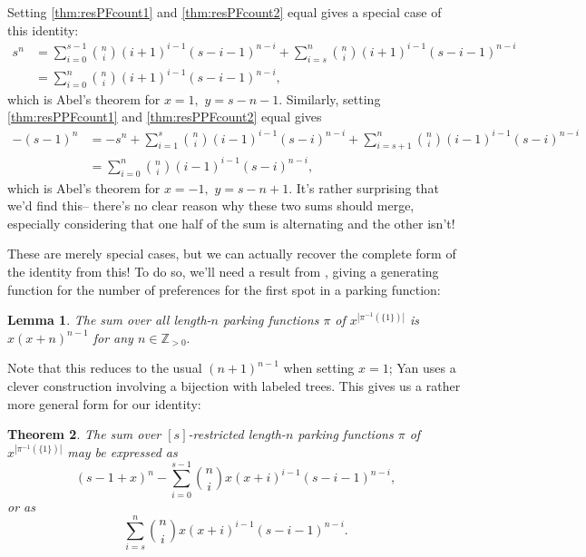 \documentclass[12 pt]{amsart}
\newtheorem{theorem}{Theorem}[section]
\newtheorem{lemma}[theorem]{Lemma}
\theoremstyle{definition} %
\theoremstyle{remark} %
\begin{document}
Setting \cref{thm:resPFcount1} and \cref{thm:resPFcount2} equal gives a special case of this identity:
\begin{align*}
    s^{n} &= \sum_{i = 0}^{s - 1} \binom{n}{i} (i + 1)^{i - 1} (s - i - 1)^{n - i} + \sum_{i = s}^{n} \binom{n}{i} (i + 1)^{i - 1} (s - i - 1)^{n - i}\\
    &=\sum_{i = 0}^{n} \binom{n}{i} (i + 1)^{i - 1} (s - i - 1)^{n - i},
\end{align*}
which is Abel's theorem for $x=1,$ $y=s-n-1.$ Similarly, setting \cref{thm:resPPFcount1} and \cref{thm:resPPFcount2} equal gives 
\begin{align*}
    - (s - 1)^{n} &= -s^n + \sum_{i = 1}^{s} \binom{n}{i} (i - 1)^{i - 1} (s - i)^{n - i} + \sum_{i = s + 1}^{n} \binom{n}{i} (i - 1)^{i - 1} (s - i)^{n - i}\\
    &=\sum_{i=0}^n \binom{n}{i} (i - 1)^{i - 1} (s - i)^{n - i},
\end{align*}
which is Abel's theorem for $x=-1,$ $y=s-n+1.$ It's rather surprising that we'd find this-- there's no clear reason why these two sums should merge, especially considering that one half of the sum is alternating and the other isn't!

These are merely special cases, but we can actually recover the complete form of the identity from this! To do so, we'll need a result from \cite{yan-survey-2015}, giving a generating function for the number of preferences for the first spot in a parking function: %

\begin{lemma}
    The sum over all length-$n$ parking functions $\pi$ of $x^{|\pi^{-1}(\{1\})|}$ is $x(x+n)^{n-1}$ for any $n\in\mathbb{Z}_{>0}.$
\end{lemma}

Note that this reduces to the usual $(n+1)^{n-1}$ when setting $x=1$; Yan uses a clever construction involving a bijection with labeled trees. This gives us a rather more general form for our identity:

\begin{theorem}
    \label{thm:res-1s-enumerator}
    The sum over $[s]$-restricted length-$n$ parking functions $\pi$ of $x^{|\pi^{-1}(\{1\})|}$ may be expressed as
    \[(s-1+x)^{n} - \sum_{i = 0}^{s - 1} \binom{n}{i} x(x + i)^{i - 1} (s - i - 1)^{n - i},\]
    or as
    \[\sum_{i = s}^{n} \binom{n}{i} x(x + i)^{i - 1} (s - i - 1)^{n - i}.\]
\end{theorem}
\end{document}

